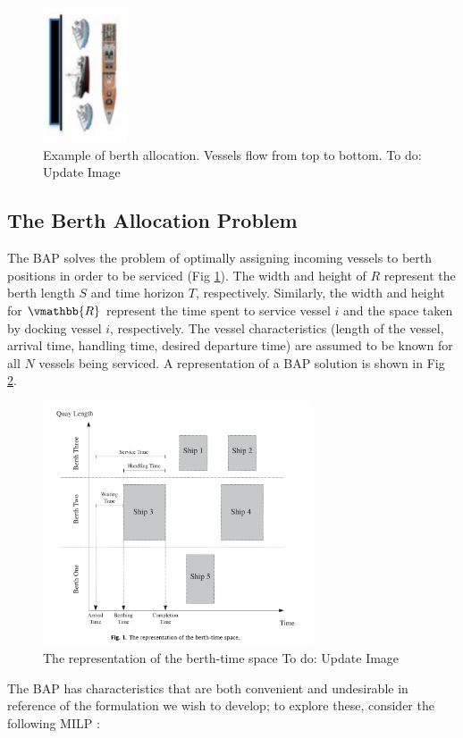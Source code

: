 \documentclass[letterpaper, 10pt, conference]{IEEEtran}
\newcommand{\TODO}[1]{{\color{green} To do: #1}} %
\begin{document}
\begin{figure}
	\centerline{\includegraphics[height=4cm]{bapexample.png}}
	\caption{Example of berth allocation. Vessels flow from top to bottom.\TODO{Update Image}}
	\label{fig:bapexample}
\end{figure}

\subsection{The Berth Allocation Problem}
The BAP solves the problem of optimally assigning incoming vessels to berth positions in order to be serviced (Fig \ref{fig:bapexample}). The width and height of \(R\) represent the berth length \(S\) and time horizon \(T\), respectively. Similarly, the width and height for \(\vmathbb{R}\) represent the time spent to service vessel $i$ and the space taken by docking vessel $i$, respectively. The vessel characteristics (length of the vessel, arrival time, handling time, desired departure time) are assumed to be known for all $N$ vessels being serviced. A representation of a BAP solution is shown in Fig \ref{fig:bap}.

\begin{figure}
	\centerline{\includegraphics[width=8cm]{bap.png}}
	\caption{The representation of the berth-time space \TODO{Update Image}}
	\label{fig:bap}
\end{figure}

The BAP has characteristics that are both convenient and undesirable in reference of the formulation we wish to develop; to explore these, consider the following MILP \cite{Qarebagh2019}:
\end{document}
